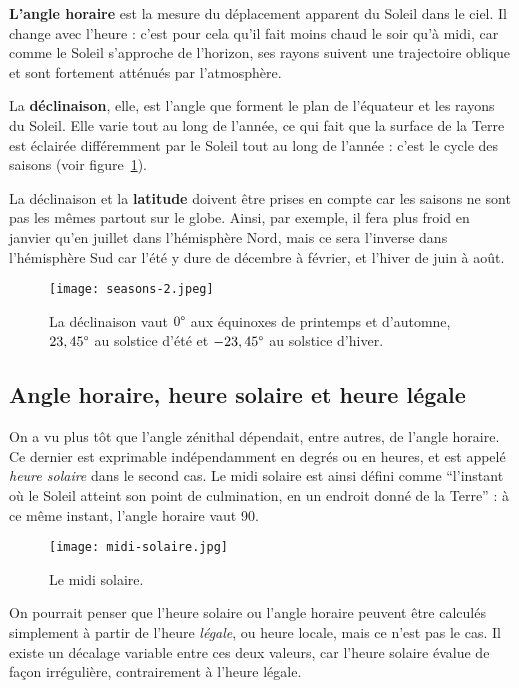 \documentclass[12pt]{article}
\begin{document}
\textbf{L'angle horaire} est la mesure du déplacement apparent du Soleil dans le ciel. 
Il change avec l'heure : c'est pour cela qu'il fait moins chaud le soir qu'à midi, car comme le Soleil s'approche de l'horizon, ses rayons suivent une trajectoire oblique et sont fortement atténués par l'atmosphère.

La \textbf{déclinaison}, elle, est l'angle que forment le plan de l'équateur et les rayons du Soleil.
Elle varie tout au long de l'année,  ce qui fait que la surface de la Terre est éclairée différemment par le Soleil tout au long de l'année : c'est le cycle des saisons (voir figure~\ref{fig:seasons-year}).

La déclinaison et la \textbf{latitude} doivent être prises en compte car les saisons ne sont pas les mêmes partout sur le globe.
Ainsi, par exemple, il fera plus froid en janvier qu'en juillet dans l'hémisphère Nord, mais ce sera l'inverse dans l'hémisphère Sud car l'été y dure de décembre à février, et l'hiver de juin à août.

 \begin{figure}[H]
	\centerline{\texttt{[image: seasons-2.jpeg]}}
	\caption{La déclinaison vaut $0\degree$ aux équinoxes de printemps et d'automne, $23,45\degree$ au solstice d'été et $-23,45\degree$ au solstice d'hiver.}
	\label{fig:seasons-year}
\end{figure}
	

\subsection{Angle horaire, heure solaire et heure légale}

On a vu plus tôt que l'angle zénithal dépendait, entre autres, de l'angle horaire.
Ce dernier est exprimable indépendamment en degrés ou en heures, et est appelé \emph{heure solaire} dans le second cas.
Le midi solaire est ainsi défini comme ``l'instant où le Soleil atteint son point de culmination, en un endroit donné de la Terre'' \cite{temps_solaire_wiki} : à ce même instant, l'angle horaire vaut 90\degree.

 \begin{figure}[H]
	\centerline{\texttt{[image: midi-solaire.jpg]}}
	\caption{Le midi solaire.}
	\label{fig:solar-noon}
\end{figure}

On pourrait penser que l'heure solaire ou l'angle horaire peuvent être calculés simplement à partir de l'heure \emph{légale}, ou heure locale, mais ce n'est pas le cas.
Il existe un décalage variable entre ces deux valeurs, car l'heure solaire évalue de façon irrégulière, contrairement à l'heure légale.
\end{document}
